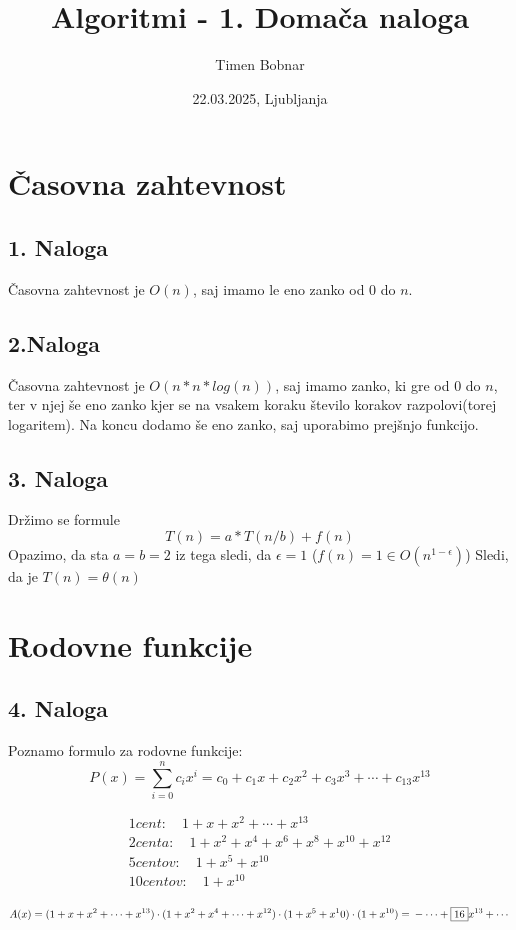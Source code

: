\documentclass[a4paper,12pt]{article}
\title{Algoritmi - 1. Domača naloga}
\author{Timen Bobnar}
\date{22.03.2025, Ljubljanja}
\begin{document}
\setlength{\parindent}{0cm}
\maketitle

\section{Časovna zahtevnost}
\subsection{1. Naloga}
Časovna zahtevnost je $O(n)$, saj imamo le eno zanko od $0$ do $n$.

\subsection{2.Naloga}
Časovna zahtevnost je $O(n*n*log(n))$, saj imamo zanko, ki gre od $0$ do $n$, ter v njej še eno zanko kjer se na vsakem koraku število korakov razpolovi(torej logaritem). Na koncu dodamo še eno zanko, saj uporabimo prejšnjo funkcijo.

\subsection{3. Naloga}
Držimo se formule $$T(n)=a*T(n/b)+f(n)$$
Opazimo, da sta $a=b=2$ iz tega sledi, da $\epsilon = 1 $ ($f(n)=1 \in O(n^{1-\epsilon})$)
Sledi, da je $T(n)=\theta(n)$               

\section{Rodovne funkcije}
\subsection{4. Naloga}
Poznamo formulo za rodovne funkcije:
$$P(x) = \sum_{i=0}^{n} c_i x^i = c_0 + c_1 x + c_2 x^2 + c_3 x^3 + \cdots + c_{13} x^{13}$$

\begin{align*}
1 cent : \quad 1+ x + x^2 + \cdots + x^{13} \\
2 centa: \quad 1+ x^2 + x^4 + x^6 + x^8 + x^{10} + x^{12} \\
5 centov: \quad 1+ x^5 + x^{10} \\
10 centov: \quad 1+x^{10}
\end{align*}


$$ A(x) = (1+x + x^2 + \cdots + x^{13}) \cdot (1+x^2 + x^4 + \cdots + x^{12}) \cdot (1+x^5 + x^10) \cdot (1+x^{10}) = \\
- \cdots + \boxed{16} x^{13} + \cdots $$
\end{document}

